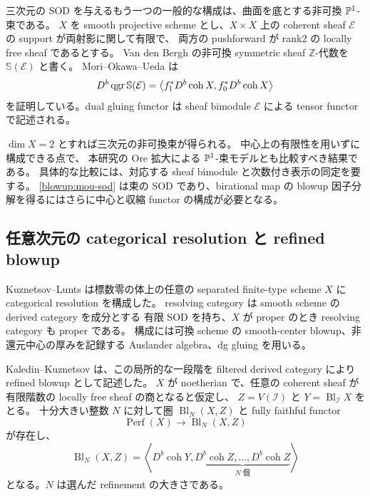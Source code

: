 三次元の SOD を与えるもう一つの一般的な構成は、曲面を底とする非可換
$\mathbb P^1$-束である。
$X$ を smooth projective scheme とし、$X\times X$ 上の coherent sheaf
$\mathcal E$ の support が両射影に関して有限で、
両方の pushforward が rank2 の locally free sheaf であるとする。
Van den Bergh の非可換 symmetric sheaf $\mathbb Z$-代数を
$\mathbb S(\mathcal E)$ と書く。
Mori--Okawa--Ueda は
\begin{equation}\label{blowup:mou-sod}
 D^b\operatorname{qgr}\mathbb S(\mathcal E)
 =\left\langle
      f_1^*D^b\operatorname{coh}X,
      f_0^*D^b\operatorname{coh}X
   \right\rangle
\end{equation}
を証明している。dual gluing functor は sheaf bimodule
$\mathcal E$ による tensor functor で記述される。
\cite[定理5.1]{BlowupMOU2019}

$\dim X=2$ とすれば三次元の非可換束が得られる。
中心上の有限性を用いずに構成できる点で、
本研究の Ore 拡大による $\mathbb P^1$-束モデルとも比較すべき結果である。
具体的な比較には、対応する sheaf bimodule と次数付き表示の同定を要する。
\eqref{blowup:mou-sod} は束の SOD であり、birational map の
blowup 因子分解を得るにはさらに中心と収縮 functor の構成が必要となる。

\subsection{任意次元の categorical resolution と refined blowup}
\label{blowup:categorical}

Kuznetsov--Lunts は標数零の体上の任意の separated finite-type scheme $X$ に
categorical resolution を構成した。
resolving category は smooth scheme の derived category を成分とする
有限 SOD を持ち、$X$ が proper のとき resolving category も proper である。
構成には可換 scheme の smooth-center blowup、非還元中心の厚みを記録する
Auslander algebra、dg gluing を用いる。
\cite[定理1.4]{BlowupKL2015}

Kaledin--Kuznetsov は、この局所的な一段階を filtered derived category により
refined blowup として記述した。
$X$ が noetherian で、任意の coherent sheaf が有限階数の locally free sheaf の商となると仮定し、
$Z=V(\mathcal I)$ と $Y=\operatorname{Bl}_{\mathcal I}X$ をとる。
十分大きい整数 $N$ に対して圏 $\operatorname{Bl}_N(X,Z)$ と fully faithful functor
\[
 \operatorname{Perf}(X)\longrightarrow\operatorname{Bl}_N(X,Z)
\]
が存在し、
\begin{equation}\label{blowup:refined-sod}
 \operatorname{Bl}_N(X,Z)
 =\left\langle D^b\operatorname{coh}Y,
   \underbrace{D^b\operatorname{coh}Z,\ldots,D^b\operatorname{coh}Z}_{N\text{ 個}}
   \right\rangle
\end{equation}
となる。$N$ は選んだ refinement の大きさである。
\cite[定義1.7、命題1.8、式(1.9)]{BlowupKK2015}

